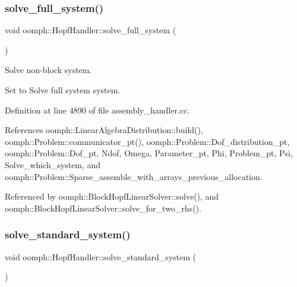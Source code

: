 \mbox{\label{classoomph_1_1HopfHandler_a507681043126f6bea58cc90deed16d1d}} 
\subsubsection{\texorpdfstring{solve\+\_\+full\+\_\+system()}{solve\_full\_system()}}
{\footnotesize\ttfamily void oomph\+::\+Hopf\+Handler\+::solve\+\_\+full\+\_\+system (\begin{DoxyParamCaption}{ }\end{DoxyParamCaption})}



Solve non-\/block system. 

Set to Solve full system system. 

Definition at line 4890 of file assembly\+\_\+handler.\+cc.



References oomph\+::\+Linear\+Algebra\+Distribution\+::build(), oomph\+::\+Problem\+::communicator\+\_\+pt(), oomph\+::\+Problem\+::\+Dof\+\_\+distribution\+\_\+pt, oomph\+::\+Problem\+::\+Dof\+\_\+pt, Ndof, Omega, Parameter\+\_\+pt, Phi, Problem\+\_\+pt, Psi, Solve\+\_\+which\+\_\+system, and oomph\+::\+Problem\+::\+Sparse\+\_\+assemble\+\_\+with\+\_\+arrays\+\_\+previous\+\_\+allocation.



Referenced by oomph\+::\+Block\+Hopf\+Linear\+Solver\+::solve(), and oomph\+::\+Block\+Hopf\+Linear\+Solver\+::solve\+\_\+for\+\_\+two\+\_\+rhs().

\mbox{\label{classoomph_1_1HopfHandler_acd2149152659deef1d938739222dbcf2}} 
\subsubsection{\texorpdfstring{solve\+\_\+standard\+\_\+system()}{solve\_standard\_system()}}
{\footnotesize\ttfamily void oomph\+::\+Hopf\+Handler\+::solve\+\_\+standard\+\_\+system (\begin{DoxyParamCaption}{ }\end{DoxyParamCaption})}



